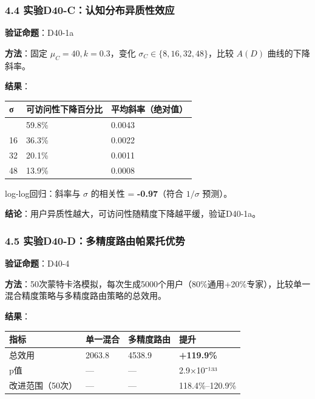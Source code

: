 \documentclass[UTF8, fontset=fandol]{ctexart}
\newcounter{none} %
\begin{document}
\subsubsection{4.4
实验D40-C：认知分布异质性效应}\label{ux5b9eux9a8cd40-cux8ba4ux77e5ux5206ux5e03ux5f02ux8d28ux6027ux6548ux5e94}

\textbf{验证命题}：D40-1a

\textbf{方法}：固定 \(\mu_C=40, k=0.3\)，变化
\(\sigma_C \in \{8, 16, 32, 48\}\)，比较 \(A(D)\) 曲线的下降斜率。

\textbf{结果}：

{\def\LTcaptype{none} %
\begin{longtable}[]{@{}lll@{}}
\toprule\noalign{}
σ & 可访问性下降百分比 & 平均斜率（绝对值） \\
\midrule\noalign{}
\endhead
\bottomrule\noalign{}
\endlastfoot
8 & 59.8\% & 0.0043 \\
16 & 36.3\% & 0.0022 \\
32 & 20.1\% & 0.0011 \\
48 & 13.9\% & 0.0008 \\
\end{longtable}
}

log-log回归：斜率与 \(\sigma\) 的相关性 = \textbf{-0.97}（符合
\(1/\sigma\) 预测）。

\textbf{结论}：用户异质性越大，可访问性随精度下降越平缓，验证D40-1a。

\subsubsection{4.5
实验D40-D：多精度路由帕累托优势}\label{ux5b9eux9a8cd40-dux591aux7cbeux5ea6ux8defux7531ux5e15ux7d2fux6258ux4f18ux52bf}

\textbf{验证命题}：D40-4

\textbf{方法}：50次蒙特卡洛模拟，每次生成5000个用户（80\%通用+20\%专家），比较单一混合精度策略与多精度路由策略的总效用。

\textbf{结果}：

{\def\LTcaptype{none} %
\begin{longtable}[]{@{}llll@{}}
\toprule\noalign{}
指标 & 单一混合 & 多精度路由 & 提升 \\
\midrule\noalign{}
\endhead
\bottomrule\noalign{}
\endlastfoot
总效用 & 2063.8 & 4538.9 & \textbf{+119.9\%} \\
p值 & --- & --- & 2.9×10⁻¹³³ \\
改进范围（50次） & --- & --- & 118.4\%--120.9\% \\
\end{longtable}
}
\end{document}
